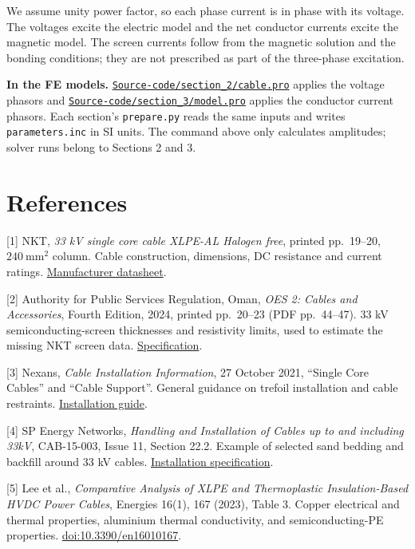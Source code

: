 \documentclass[11pt,a4paper]{article}
\newcommand{\source}[2]{\href{#1}{#2}}
\newcommand{\codefile}[1]{\href{run:#1}{\nolinkurl{#1}}}
\begin{document}
We assume unity power factor, so each phase current is in phase with its
voltage. The voltages excite the electric model and the net conductor currents
excite the magnetic model. The screen currents follow from the magnetic
solution and the bonding conditions; they are not prescribed as part of the
three-phase excitation.

{\small
\textbf{In the FE models.} \codefile{Source-code/section_2/cable.pro} applies
the voltage phasors and \codefile{Source-code/section_3/model.pro} applies
the conductor current phasors. Each section's \texttt{prepare.py} reads the
same inputs and writes \texttt{parameters.inc} in SI units. The command above
only calculates amplitudes; solver runs belong to Sections 2 and 3.\par}

\newpage
\section*{References}
\begingroup\small\setlength{\parskip}{10pt}
[1] NKT, \textit{33 kV single core cable XLPE-AL Halogen free}, printed
pp.~19--20, \(240~\mathrm{mm^2}\) column. Cable construction, dimensions,
DC resistance and current ratings.
\source{https://nkt.widen.net/content/d8gut55fhb/pdf/33kV_1-core_XLPE-AL-RMP-FB-ST_CU_screen_DSENAPP_MV_DS_EN.pdf?u=gj0n1y}{Manufacturer datasheet}.

[2] Authority for Public Services Regulation, Oman, \textit{OES 2: Cables and
Accessories}, Fourth Edition, 2024, printed pp.~20--23 (PDF pp.~44--47).
33 kV semiconducting-screen thicknesses and resistivity limits, used to
estimate the missing NKT screen data.
\source{https://www.dcrp-oman.com/documents/DCRP\%20Updates/OES2\%204th\%20Edition-Circular.pdf}{Specification}.

[3] Nexans, \textit{Cable Installation Information}, 27 October 2021,
``Single Core Cables'' and ``Cable Support''. General guidance on trefoil
installation and cable restraints.
\source{https://www.nexans.com.au/en/Newsroom/news/details/2021/10/Cable-Installation-Information.html}{Installation guide}.

[4] SP Energy Networks, \textit{Handling and Installation of Cables up to and
including 33kV}, CAB-15-003, Issue 11, Section 22.2. Example of selected
sand bedding and backfill around 33 kV cables.
\source{https://www.spenergynetworks.co.uk/userfiles/file/CAB-15-003-issue-11.pdf}{Installation specification}.

[5] Lee et al., \textit{Comparative Analysis of XLPE and Thermoplastic
Insulation-Based HVDC Power Cables}, Energies 16(1), 167 (2023), Table 3.
Copper electrical and thermal properties, aluminium thermal conductivity,
and semiconducting-PE properties.
\source{https://doi.org/10.3390/en16010167}{doi:10.3390/en16010167}.
\end{document}
